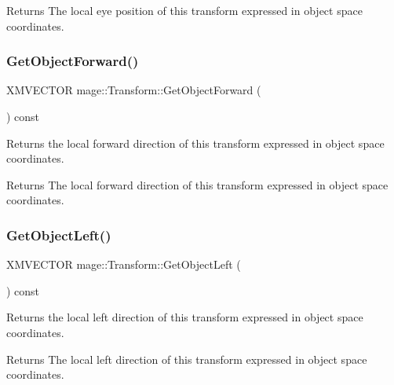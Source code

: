 \begin{DoxyReturn}{Returns}
The local eye position of this transform expressed in object space coordinates. 
\end{DoxyReturn}
\hypertarget{structmage_1_1_transform_affc4bcfe6ca76005db8676de867aede0}{}\label{structmage_1_1_transform_affc4bcfe6ca76005db8676de867aede0} 
\subsubsection{\texorpdfstring{Get\+Object\+Forward()}{GetObjectForward()}}
{\footnotesize\ttfamily X\+M\+V\+E\+C\+T\+OR mage\+::\+Transform\+::\+Get\+Object\+Forward (\begin{DoxyParamCaption}{ }\end{DoxyParamCaption}) const}

Returns the local forward direction of this transform expressed in object space coordinates.

\begin{DoxyReturn}{Returns}
The local forward direction of this transform expressed in object space coordinates. 
\end{DoxyReturn}
\hypertarget{structmage_1_1_transform_a12946ff32c7044889f7c89c9182dba76}{}\label{structmage_1_1_transform_a12946ff32c7044889f7c89c9182dba76} 
\subsubsection{\texorpdfstring{Get\+Object\+Left()}{GetObjectLeft()}}
{\footnotesize\ttfamily X\+M\+V\+E\+C\+T\+OR mage\+::\+Transform\+::\+Get\+Object\+Left (\begin{DoxyParamCaption}{ }\end{DoxyParamCaption}) const}

Returns the local left direction of this transform expressed in object space coordinates.

\begin{DoxyReturn}{Returns}
The local left direction of this transform expressed in object space coordinates. 
\end{DoxyReturn}
\hypertarget{structmage_1_1_transform_a2f7cfedf5c67115cb6c29aac07c71d07}{}\label{structmage_1_1_transform_a2f7cfedf5c67115cb6c29aac07c71d07} 

